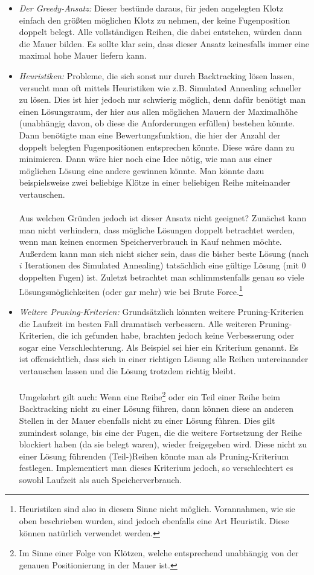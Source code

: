 \documentclass[a4paper, notitlepage, 12pt]{scrartcl}
\begin{document}
\begin{itemize}
\item \textit{Der Greedy-Ansatz:} Dieser bestünde daraus, für jeden angelegten Klotz einfach den größten möglichen Klotz zu nehmen, der keine Fugenposition doppelt belegt. Alle vollständigen Reihen, die dabei entstehen, würden dann die Mauer bilden. Es sollte klar sein, dass dieser Ansatz keinesfalls immer eine maximal hohe Mauer liefern kann.
\item \textit{Heuristiken:} Probleme, die sich sonst nur durch Backtracking lösen lassen, versucht man oft mittels Heuristiken wie z.B. Simulated Annealing schneller zu lösen. Dies ist hier jedoch nur schwierig möglich, denn dafür benötigt man einen Lösungsraum, der hier aus allen möglichen Mauern der Maximalhöhe (unabhängig davon, ob diese die Anforderungen erfüllen) bestehen könnte. Dann benötigte man eine Bewertungsfunktion, die hier der Anzahl der doppelt belegten Fugenpositionen entsprechen könnte. Diese wäre dann zu minimieren. Dann wäre hier noch eine Idee nötig, wie man aus einer möglichen Lösung eine andere gewinnen könnte. Man könnte dazu beispielsweise zwei beliebige Klötze in einer beliebigen Reihe miteinander vertauschen. \\ \\
Aus welchen Gründen jedoch ist dieser Ansatz nicht geeignet? Zunächst kann man nicht verhindern, dass mögliche Lösungen doppelt betrachtet werden, wenn man keinen enormen Speicherverbrauch in Kauf nehmen möchte. Außerdem kann man sich nicht sicher sein, dass die bisher beste Lösung (nach $i$ Iterationen des Simulated Annealing) tatsächlich eine gültige Lösung (mit 0 doppelten Fugen) ist. Zuletzt betrachtet man schlimmstenfalls genau so viele Lösungsmöglichkeiten (oder gar mehr) wie bei Brute Force.\footnote{Heuristiken sind also in diesem Sinne nicht möglich. Vorannahmen, wie sie oben beschrieben wurden, sind jedoch ebenfalls eine Art Heuristik. Diese können natürlich verwendet werden.}
\item \textit{Weitere Pruning-Kriterien:} Grundsätzlich könnten weitere Pruning-Kriterien die Laufzeit im besten Fall dramatisch verbessern. Alle weiteren Pruning-Kriterien, die ich gefunden habe, brachten jedoch keine Verbesserung oder sogar eine Verschlechterung. Als Beispiel sei hier ein Kriterium genannt. Es ist offensichtlich, dass sich in einer richtigen Lösung alle Reihen untereinander vertauschen lassen und die Lösung trotzdem richtig bleibt. \\ \\ Umgekehrt gilt auch: Wenn eine Reihe\footnote{Im Sinne einer Folge von Klötzen, welche entsprechend unabhängig von der genauen Positionierung in der Mauer ist.} oder ein Teil einer Reihe beim Backtracking nicht zu einer Lösung führen, dann können diese an anderen Stellen in der Mauer ebenfalls nicht zu einer Lösung führen. Dies gilt zumindest solange, bis eine der Fugen, die die weitere Fortsetzung der Reihe blockiert haben (da sie belegt waren), wieder freigegeben wird. Diese nicht zu einer Lösung führenden (Teil-)Reihen könnte man als Pruning-Kriterium festlegen. Implementiert man dieses Kriterium jedoch, so verschlechtert es sowohl Laufzeit als auch Speicherverbrauch.
\end{itemize}
\end{document}
